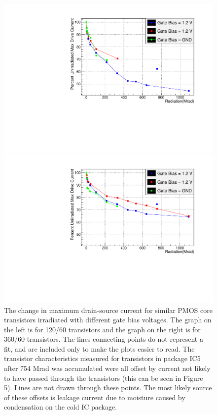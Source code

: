 \begin{figure}
\begin{minipage}[b]{0.5\textwidth}
	\centering
	\includegraphics[width=\linewidth]{pd012_comparing_bias_conditions_paper.pdf}
\end{minipage}
\hspace{0.5cm}
\begin{minipage}[b]{0.5\textwidth}
	\centering
	\includegraphics[width=\linewidth]{pd036_comparing_bias_conditions_paper.pdf}
\end{minipage}
\caption{The change in maximum drain-source current for similar PMOS core transistors irradiated with different gate bias voltages. The graph on the left is for 120/60 transistors and the graph on the right is for 360/60 transistors.  The lines connecting points do not represent a fit, and are included only to make the plots easier to read.  The transistor characteristics measured for transistors in package IC5 after 754 Mrad was accumulated were all offset by current not likely to have passed through the transistors (this can be seen in Figure 5).  Lines are not drawn through these points.  The most likely source of these offsets is leakage current due to moisture caused by condensation on the cold IC package.}
\label{fig:PMOSBiasConditions}
\end{figure}

